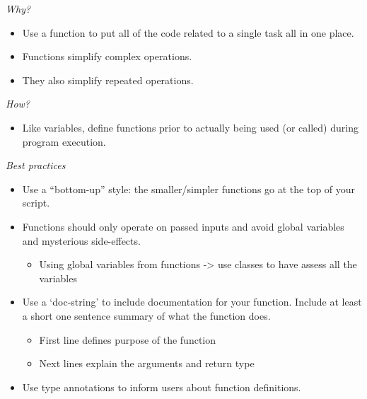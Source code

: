 \documentclass[
  letterpaper,
  DIV=11,
  numbers=noendperiod]{scrreprt}
\providecommand{\tightlist}{%
  \setlength{\itemsep}{0pt}\setlength{\parskip}{0pt}}
\begin{document}
\emph{Why?}

\begin{itemize}
\tightlist
\item
  Use a function to put all of the code related to a single task all in
  one place.
\item
  Functions simplify complex operations.
\item
  They also simplify repeated operations.
\end{itemize}

\emph{How?}

\begin{itemize}
\tightlist
\item
  Like variables, define functions prior to actually being used (or
  called) during program execution.
\end{itemize}

\emph{Best practices}

\begin{itemize}
\tightlist
\item
  Use a ``bottom-up'' style: the smaller/simpler functions go at the top
  of your script.
\item
  Functions should only operate on passed inputs and avoid global
  variables and mysterious side-effects.

  \begin{itemize}
  \tightlist
  \item
    Using global variables from functions -\textgreater{} use classes to
    have assess all the variables
  \end{itemize}
\item
  Use a `doc-string' to include documentation for your function. Include
  at least a short one sentence summary of what the function does.

  \begin{itemize}
  \tightlist
  \item
    First line defines purpose of the function
  \item
    Next lines explain the arguments and return type
  \end{itemize}
\item
  Use type annotations to inform users about function definitions.
\end{itemize}
\end{document}

